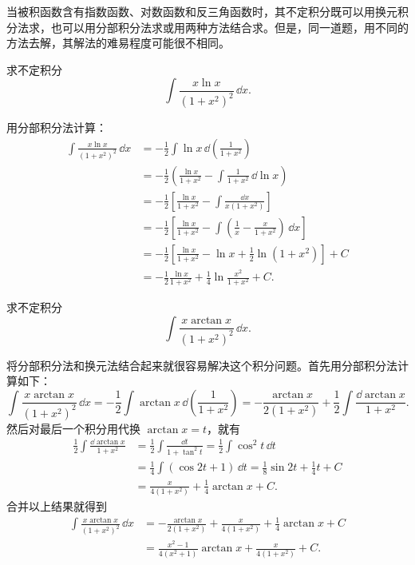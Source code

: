 当被积函数含有指数函数、对数函数和反三角函数时，其不定积分既可以用换元积分法求，也可以用分部积分法求或用两种方法结合求。但是，同一道题，用不同的方法去解，其解法的难易程度可能很不相同。

\begin{xexample}[9.1.5]
求不定积分
\[
  \int\frac{x\ln x}{(1+x^2)^2}\,\dd x.
\]
\end{xexample}

\begin{xsolution}
用分部积分法计算：
\begin{align*}
  \int\frac{x\ln x}{(1+x^2)^2}\,\dd x
  &=-\frac12\int\ln x\,\dd\left(\frac1{1+x^2}\right)\\
  &=-\frac12\left(\frac{\ln x}{1+x^2}-\int\frac1{1+x^2}\,\dd\ln x\right)\\
  &=-\frac12\left[\frac{\ln x}{1+x^2}-\int\frac{\dd x}{x(1+x^2)}\right]\\
  &=-\frac12\left[\frac{\ln x}{1+x^2}-\int\left(\frac1x-\frac{x}{1+x^2}\right)\,\dd x\right]\\
  &=-\frac12\left[\frac{\ln x}{1+x^2}-\ln x+\frac12\ln(1+x^2)\right]+C\\
  &=-\frac12\frac{\ln x}{1+x^2}+\frac14\ln\frac{x^2}{1+x^2}+C.
\end{align*}
\end{xsolution}

\begin{xexample}[9.1.6]
求不定积分
\[
  \int\frac{x\arctan x}{(1+x^2)^2}\,\dd x.
\]
\end{xexample}

\begin{xsolution}
将分部积分法和换元法结合起来就很容易解决这个积分问题。首先用分部积分法计算如下：
\[
  \int\frac{x\arctan x}{(1+x^2)^2}\,\dd x
   =-\frac12\int\arctan x\,\dd\left(\frac1{1+x^2}\right)
   =-\frac{\arctan x}{2(1+x^2)}+\frac12\int\frac{\dd\arctan x}{1+x^2}.
\]
然后对最后一个积分用代换 $\arctan x=t$，就有
\begin{align*}
  \frac12\int\frac{\dd\arctan x}{1+x^2}
  &=\frac12\int\frac{\dd t}{1+\tan^2t}
   =\frac12\int\cos^2t\,\dd t\\
  &=\frac14\int(\cos2t+1)\,\dd t
   =\frac18\sin2t+\frac14t+C\\
  &=\frac{x}{4(1+x^2)}+\frac14\arctan x+C.
\end{align*}
合并以上结果就得到
\begin{align*}
  \int\frac{x\arctan x}{(1+x^2)^2}\,\dd x
  &=-\frac{\arctan x}{2(1+x^2)}+\frac{x}{4(1+x^2)}+\frac14\arctan x+C\\
  &=\frac{x^2-1}{4(x^2+1)}\arctan x+\frac{x}{4(1+x^2)}+C.
\end{align*}
\end{xsolution}

